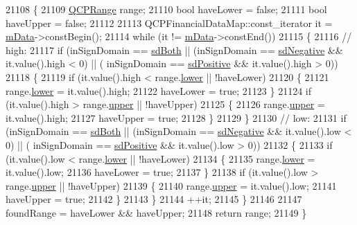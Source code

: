 \begin{DoxyCode}
21108 \{
21109   \hyperlink{class_q_c_p_range}{QCPRange} range;
21110   \textcolor{keywordtype}{bool} haveLower = \textcolor{keyword}{false};
21111   \textcolor{keywordtype}{bool} haveUpper = \textcolor{keyword}{false};
21112   
21113   QCPFinancialDataMap::const\_iterator it = \hyperlink{class_q_c_p_financial_a475f63587ca1077d8c30aaf2b71ae026}{mData}->constBegin();
21114   \textcolor{keywordflow}{while} (it != \hyperlink{class_q_c_p_financial_a475f63587ca1077d8c30aaf2b71ae026}{mData}->constEnd())
21115   \{
21116     \textcolor{comment}{// high:}
21117     \textcolor{keywordflow}{if} (inSignDomain == \hyperlink{class_q_c_p_abstract_plottable_a661743478a1d3c09d28ec2711d7653d8a082b98cfb91a7363a3b5cd17b0c1cd60}{sdBoth} || (inSignDomain == \hyperlink{class_q_c_p_abstract_plottable_a661743478a1d3c09d28ec2711d7653d8a0fc9a70796ef60ad18ddd18056e6dc63}{sdNegative} && it.value().high < 0) || (
      inSignDomain == \hyperlink{class_q_c_p_abstract_plottable_a661743478a1d3c09d28ec2711d7653d8a02951859f243a4d24e779cfbb5471030}{sdPositive} && it.value().high > 0))
21118     \{
21119       \textcolor{keywordflow}{if} (it.value().high < range.\hyperlink{class_q_c_p_range_aa3aca3edb14f7ca0c85d912647b91745}{lower} || !haveLower)
21120       \{
21121         range.\hyperlink{class_q_c_p_range_aa3aca3edb14f7ca0c85d912647b91745}{lower} = it.value().high;
21122         haveLower = \textcolor{keyword}{true};
21123       \}
21124       \textcolor{keywordflow}{if} (it.value().high > range.\hyperlink{class_q_c_p_range_ae44eb3aafe1d0e2ed34b499b6d2e074f}{upper} || !haveUpper)
21125       \{
21126         range.\hyperlink{class_q_c_p_range_ae44eb3aafe1d0e2ed34b499b6d2e074f}{upper} = it.value().high;
21127         haveUpper = \textcolor{keyword}{true};
21128       \}
21129     \}
21130     \textcolor{comment}{// low:}
21131     \textcolor{keywordflow}{if} (inSignDomain == \hyperlink{class_q_c_p_abstract_plottable_a661743478a1d3c09d28ec2711d7653d8a082b98cfb91a7363a3b5cd17b0c1cd60}{sdBoth} || (inSignDomain == \hyperlink{class_q_c_p_abstract_plottable_a661743478a1d3c09d28ec2711d7653d8a0fc9a70796ef60ad18ddd18056e6dc63}{sdNegative} && it.value().low < 0) || (
      inSignDomain == \hyperlink{class_q_c_p_abstract_plottable_a661743478a1d3c09d28ec2711d7653d8a02951859f243a4d24e779cfbb5471030}{sdPositive} && it.value().low > 0))
21132     \{
21133       \textcolor{keywordflow}{if} (it.value().low < range.\hyperlink{class_q_c_p_range_aa3aca3edb14f7ca0c85d912647b91745}{lower} || !haveLower)
21134       \{
21135         range.\hyperlink{class_q_c_p_range_aa3aca3edb14f7ca0c85d912647b91745}{lower} = it.value().low;
21136         haveLower = \textcolor{keyword}{true};
21137       \}
21138       \textcolor{keywordflow}{if} (it.value().low > range.\hyperlink{class_q_c_p_range_ae44eb3aafe1d0e2ed34b499b6d2e074f}{upper} || !haveUpper)
21139       \{
21140         range.\hyperlink{class_q_c_p_range_ae44eb3aafe1d0e2ed34b499b6d2e074f}{upper} = it.value().low;
21141         haveUpper = \textcolor{keyword}{true};
21142       \}
21143     \}
21144     ++it;
21145   \}
21146   
21147   foundRange = haveLower && haveUpper;
21148   \textcolor{keywordflow}{return} range;
21149 \}
\end{DoxyCode}

